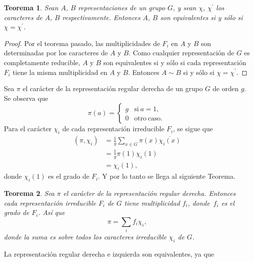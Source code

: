 \documentclass[12pt]{book}
\newtheorem{theorem}{Teorema}[section]
\theoremstyle{definition}
\newcounter{in}
\begin{document}
\begin{theorem}
  \label{t4_6}
  Sean $A$, $B$ representaciones de un grupo $G$, y sean $\chi$,
  $\chi^{'}$ los caracteres de $A$, $B$ respectivamente. Entonces $A$,
  $B$ son equivalentes si y sólo si $\chi=\chi^{'}$.
\end{theorem}

\begin{proof}
  Por el teorema pasado, las multiplicidades de $F_{i}$ en $A$ y $B$
  son determinadas por los caracteres de $A$ y $B$. Como cualquier
  representación de $G$ es completamente reducible, $A$ y $B$ son
  equivalentes si y sólo si cada representación $F_{i}$ tiene la misma
  multiplicidad en $A$ y $B$. Entonces $A \sim B$ si y sólo si $\chi=\chi^{'}$.
\end{proof}

Sea $\pi$ el carácter de la representación regular derecha de un grupo
$G$ de orden $g$. Se observa que
\begin{equation}
  \label{eq:39}
   \pi(a) = \left\{
     \begin{array}{ll}
       g      & \mathrm{si\ } a = 1, \\
       0      & \mathrm{otro\ caso.\ } 
     \end{array}
   \right.
\end{equation}
Para el carácter $\chi_{i}$ de cada representación irreducible
$F_{i}$, se sigue que
\begin{equation}
  \label{eq:40}
  \begin{aligned}
    (\pi,\chi_{i}) & =\frac{1}{g} \sum_{x \in G} \pi(x) \overline{\chi_{i}(x)} \\
    &=\frac{1}{g} \pi(1) \chi_{i}(1) \\
    &=\chi_{i}(1),
  \end{aligned}
\end{equation}
donde $\chi_{i}(1)$ es el grado de $F_{i}$. Y por lo tanto se llega al
siguiente Teorema.
\begin{theorem}
  \label{t4_7}
  Sea $\pi$ el carácter de la representación regular derecha. Entonces
  cada representación irreducible $F_{i}$ de $G$ tiene multiplicidad
  $f_{i}$, donde~$f_{i}$ es el grado de $F_{i}$. Así que
  \begin{equation*}
    \pi=\sum_{i} f_{i} \chi_{i},
  \end{equation*}
  donde la suma es sobre todos los caracteres irreducible $\chi_{i}$ de $G$.
\end{theorem}
La representación regular derecha e izquierda son equivalentes, ya que
\end{document}
